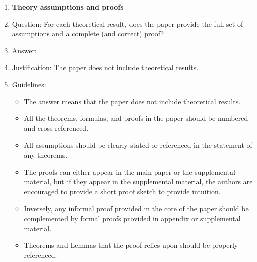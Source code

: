 \documentclass{article}
\begin{document}
\begin{enumerate}
\begin{itemize}
        \item While the authors might fear that complete honesty about limitations might be used by reviewers as grounds for rejection, a worse outcome might be that reviewers discover limitations that aren't acknowledged in the paper. The authors should use their best judgment and recognize that individual actions in favor of transparency play an important role in developing norms that preserve the integrity of the community. Reviewers will be specifically instructed to not penalize honesty concerning limitations.
    \end{itemize}

\item {\bf Theory assumptions and proofs}
    \item[] Question: For each theoretical result, does the paper provide the full set of assumptions and a complete (and correct) proof?
    \item[] Answer: \answerNA{} %
    \item[] Justification: The paper does not include theoretical results.
    \item[] Guidelines:
    \begin{itemize}
        \item The answer \answerNA{} means that the paper does not include theoretical results. 
        \item All the theorems, formulas, and proofs in the paper should be numbered and cross-referenced.
        \item All assumptions should be clearly stated or referenced in the statement of any theorems.
        \item The proofs can either appear in the main paper or the supplemental material, but if they appear in the supplemental material, the authors are encouraged to provide a short proof sketch to provide intuition. 
        \item Inversely, any informal proof provided in the core of the paper should be complemented by formal proofs provided in appendix or supplemental material.
        \item Theorems and Lemmas that the proof relies upon should be properly referenced. 
    \end{itemize}


\end{enumerate}
\end{document}
